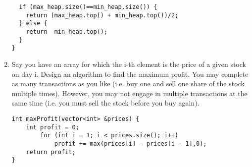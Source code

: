 \documentclass[10pt, onecolumn, draftcls]{IEEEtran}
\begin{document}
\begin{enumerate}
\begin{lstlisting}
  if (max_heap.size()==min_heap.size()) {
    return (max_heap.top() + min_heap.top())/2;
  } else {
    return  min_heap.top();
  }
}
\end{lstlisting}
\item
Say you have an array for which the i-th element is the price of a given stock on day i. Design an algorithm to find the maximum profit. You may complete as many transactions as you like (i.e. buy one and sell one share of the stock multiple times). However, you may not engage in multiple transactions at the same time (i.e. you must sell the stock before you buy again).
\begin{lstlisting}
int maxProfit(vector<int> &prices) {
	int profit = 0;
		for (int i = 1; i < prices.size(); i++)
			profit += max(prices[i] - prices[i - 1],0);
	return profit;
}
\end{lstlisting}

\end{enumerate}
\end{document}
